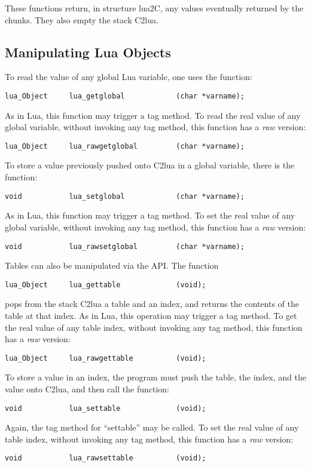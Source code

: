 These functions return, in structure lua2C,
any values eventually returned by the chunks.
They also empty the stack C2lua.


\subsection{Manipulating Lua Objects}
To read the value of any global Lua variable,
one uses the function:
\begin{verbatim}
lua_Object     lua_getglobal            (char *varname);
\end{verbatim}
As in Lua, this function may trigger a tag method.
To read the real value of any global variable,
without invoking any tag method,
this function has a \emph{raw} version:
\begin{verbatim}
lua_Object     lua_rawgetglobal         (char *varname);
\end{verbatim}

To store a value previously pushed onto C2lua in a global variable,
there is the function:
\begin{verbatim}
void           lua_setglobal            (char *varname);
\end{verbatim}
As in Lua, this function may trigger a tag method.
To set the real value of any global variable,
without invoking any tag method,
this function has a \emph{raw} version:
\begin{verbatim}
void           lua_rawsetglobal         (char *varname);
\end{verbatim}

Tables can also be manipulated via the API.
The function
\begin{verbatim}
lua_Object     lua_gettable             (void);
\end{verbatim}
pops from the stack C2lua a table and an index,
and returns the contents of the table at that index.
As in Lua, this operation may trigger a tag method.
To get the real value of any table index,
without invoking any tag method,
this function has a \emph{raw} version:
\begin{verbatim}
lua_Object     lua_rawgettable          (void);
\end{verbatim}

To store a value in an index,
the program must push the table, the index,
and the value onto C2lua,
and then call the function:
\begin{verbatim}
void           lua_settable             (void);
\end{verbatim}
Again, the tag method for ``settable'' may be called.
To set the real value of any table index,
without invoking any tag method,
this function has a \emph{raw} version:
\begin{verbatim}
void           lua_rawsettable          (void);
\end{verbatim}

